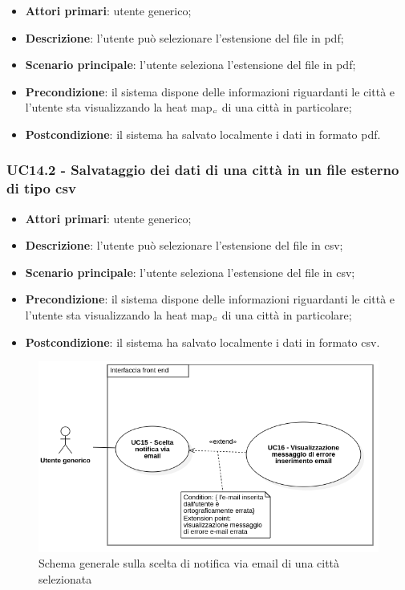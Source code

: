 \begin{itemize}
	\item \textbf{Attori primari}: utente generico;
	\item \textbf{Descrizione}: l’utente può selezionare l’estensione del file in pdf;
	\item \textbf{Scenario principale}: l’utente seleziona l’estensione del file in pdf;
	\item \textbf{Precondizione}: il sistema dispone delle informazioni riguardanti le città e  l’utente sta visualizzando la heat map$_{\scaleto{G}{3pt}}$ di una città in particolare;
	\item \textbf{Postcondizione}: il sistema ha salvato localmente i dati in formato pdf.
\end{itemize}

\subsubsection{UC14.2 - Salvataggio dei dati di una città in un file esterno di tipo csv}\label{CasiDUsoCasiDUsoFacoltativiTraUnUtenteEIlFrontEndElencoCasiDUsoUC142SalvataggioDeiDatiDiUnaCittaInUnFileEsternoDiTipoCsv}

\begin{itemize}
	\item \textbf{Attori primari}: utente generico;
	\item \textbf{Descrizione}: l’utente può selezionare l’estensione del file in csv;
	\item \textbf{Scenario principale}: l’utente seleziona l’estensione del file in csv;
	\item \textbf{Precondizione}: il sistema dispone delle informazioni riguardanti le città e  l’utente sta visualizzando la heat map$_{\scaleto{G}{3pt}}$ di una città in particolare;
	\item \textbf{Postcondizione}: il sistema ha salvato localmente i dati in formato csv.
\end{itemize}


\begin{center}
	\begin{figure}[H]
		\centering\includegraphics[scale=0.7]{../immagini/attori_casi/UC15.png}
		\caption{Schema generale sulla scelta di notifica via email di una città selezionata}
	\end{figure}
\end{center}

